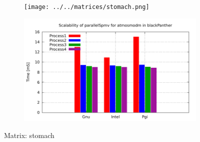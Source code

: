 \begin{figure} [ht!]
    \centering
    \captionsetup{justification=centering, singlelinecheck=false}
    \begin{subfigure}{.65\textwidth}
      \centering
      \hspace*{-3.5cm} 
      \texttt{[image: ../../matrices/stomach.png]}
      \label{fig:stomach_matrix}
    \end{subfigure}%
    \begin{subfigure}{.65\textwidth}
      \centering
      \hspace*{-6.0cm} 
      \includegraphics[page=8, width=0.95\linewidth]{../plots/blackPanther.pdf}
      \label{fig:stomach_performance}
    \end{subfigure}
\caption{Matrix: stomach}
\label{fig:stomach}
\end{figure}

